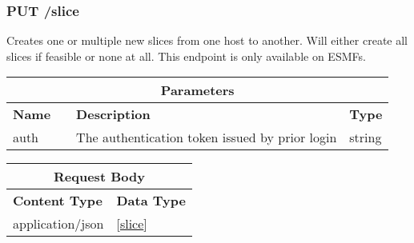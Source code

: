 \subsubsection{PUT /slice}
Creates one or multiple new slices from one host to another. Will either create all slices if feasible or none at all. This endpoint is only available on ESMFs.
\begin{longtable}{ |p{2.5cm}|p{1.5cm}|p{4cm}|p{2cm}| }
\hline
\multicolumn{4}{|c|}{\textbf{Parameters}} \\
 \hline
\textbf{Name} & \centering{\textbf{Location}} & \textbf{Description} & \textbf{Type} \\
\hline
auth & \centering{QUERY} & The authentication token issued by prior login & string \\
 \hline
\endhead \end{longtable}

\begin{longtable}{ |p{3cm}|p{7.88cm}| }
\hline
\multicolumn{2}{|c|}{\textbf{Request Body}} \\
 \hline
\textbf{Content Type} & \textbf{Data Type} \\
\hline
application/json & [\hyperref[esmf_slice]{slice}] \\
 \hline
\end{longtable}


